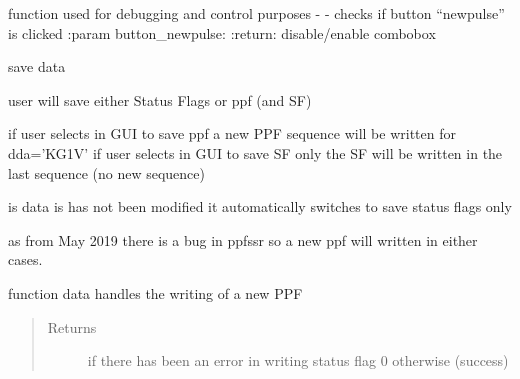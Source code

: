 \documentclass[letterpaper,10pt,english]{sphinxmanual}
\begin{document}
\begin{fulllineitems}
\begin{fulllineitems}
\end{fulllineitems}


\begin{fulllineitems}
\label{Cormat_main:Cormat_main.CORMAT_GUI.handle_check_status}
function used for debugging and control purposes -
-
checks if button ``newpulse'' is clicked
:param button\_newpulse:
:return: disable/enable combobox

\end{fulllineitems}


\begin{fulllineitems}
\label{Cormat_main:Cormat_main.CORMAT_GUI.handle_saveppfbutton}
save data

user will save either Status Flags or ppf (and SF)

if user selects in GUI to save ppf a new PPF sequence will be written for dda='KG1V'
if user selects in GUI to save SF only the SF will be written in the last sequence (no new sequence)

is data is has not been modified it automatically switches to save status flags only

as from May 2019 there is a bug in ppfssr so a new ppf will written in either cases.

\end{fulllineitems}


\begin{fulllineitems}
\label{Cormat_main:Cormat_main.CORMAT_GUI.handle_save_data_statusflag}
function data handles the writing of a new PPF
\begin{quote}\begin{description}
\item[{Returns}]  if there has been an error in writing status flag
0 otherwise (success)

\end{description}\end{quote}

\end{fulllineitems}


\end{fulllineitems}
\end{document}
